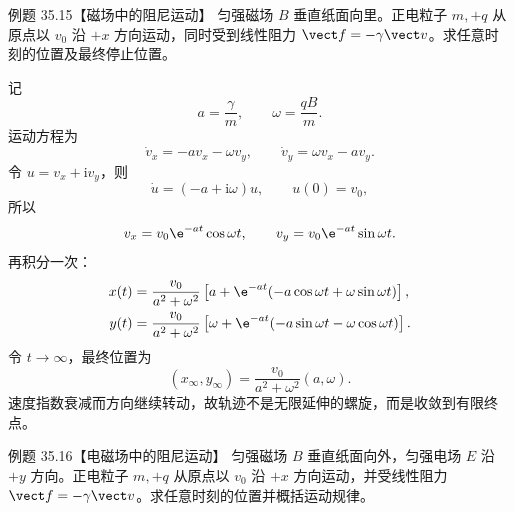 \Needspace{0.44\textheight}
\begin{origexamplebox}{例题 35.15【磁场中的阻尼运动】}
匀强磁场 $B$ 垂直纸面向里。正电粒子 $m,+q$ 从原点以 $v_0$ 沿 $+x$ 方向运动，同时受到线性阻力
$\vect f=-\gamma\vect v$。求任意时刻的位置及最终停止位置。
\end{origexamplebox}

\begin{xesolution}
记
\[
  a=\frac\gamma m,
  \qquad \omega=\frac{qB}{m}.
\]
运动方程为
\[
  \dot v_x=-av_x-\omega v_y,
  \qquad
  \dot v_y=\omega v_x-av_y.
\]
令 $u=v_x+\mathrm i v_y$，则
\[
  \dot u=(-a+\mathrm i\omega)u,
  \qquad u(0)=v_0,
\]
所以
\begin{equation}
  v_x=v_0\e^{-at}\cos\omega t,
  \qquad
  v_y=v_0\e^{-at}\sin\omega t.
\end{equation}
再积分一次：
\begin{align}
  x(t)&=\frac{v_0}{a^2+\omega^2}
  \left[a+\e^{-at}(-a\cos\omega t+\omega\sin\omega t)\right],\\
  y(t)&=\frac{v_0}{a^2+\omega^2}
  \left[\omega+\e^{-at}(-a\sin\omega t-\omega\cos\omega t)\right].
\end{align}
令 $t\to\infty$，最终位置为
\begin{equation}
  \boxed{(x_\infty,y_\infty)=
  \frac{v_0}{a^2+\omega^2}(a,\omega)}.
\end{equation}
速度指数衰减而方向继续转动，故轨迹不是无限延伸的螺旋，而是收敛到有限终点。

\dampedSpiralDiagram
\end{xesolution}

\Needspace{0.47\textheight}
\begin{origexamplebox}{例题 35.16【电磁场中的阻尼运动】}
匀强磁场 $B$ 垂直纸面向外，匀强电场 $E$ 沿 $+y$ 方向。正电粒子 $m,+q$ 从原点以 $v_0$ 沿
$+x$ 方向运动，并受线性阻力 $\vect f=-\gamma\vect v$。求任意时刻的位置并概括运动规律。
\end{origexamplebox}


